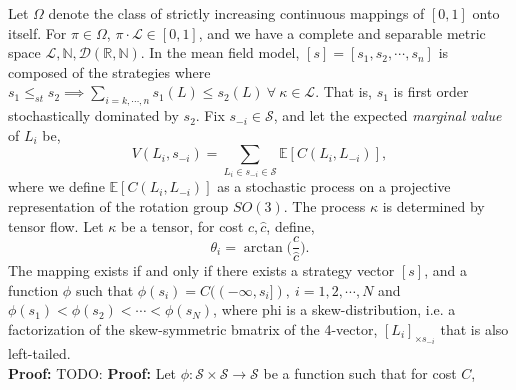 \documentclass[10pt]{article}
\newcommand{\mcL}{\mathcal{L}}
\newcommand{\mcS}{\mathcal{S}}
\newcommand{\mcD}{\mathcal{D}}
\theoremstyle{definition}
\begin{document}
Let $\Omega$ denote the class of strictly increasing continuous mappings of
$[0,1]$ onto itself. For $\pi \in \Omega$, $\pi \cdot \mcL \in [0,1]$, and we have a complete 
and separable metric space $\mcL, \mathbb{N}, \mcD(\mathbb{R},\mathbb{N})$.
In the mean field model, $[s]= [s_1, s_2, \cdots, s_n]$ is composed of
the strategies where $s_1 \le_{st} s_2 \implies \sum_{i = k, \cdots, n} s_1(L)
\le s_2(L) \ \forall \ \kappa \in \mcL$. That is, $s_1$ is first order
stochastically dominated by $s_2$. 
Fix $s_{-i}\in \mcS$, and let the expected \emph{marginal value} of $L_i$ be,
$$
    V(L_i,s_{-i}) = \displaystyle\sum_{L_i\in s_{-i}\in \mcS}\mathbb{E}[C(L_i,
    L_{-i})],
$$
where we define $\mathbb{E}[C(L_i,L_{-i})]$ 
as a stochastic process on a projective representation of the rotation group
$SO(3)$. The process $\kappa$ is determined by tensor flow.
Let $\kappa$ be a tensor, for cost $c, \hat c$, define,
$$
    \theta_i = \arctan\bigg(\frac{c}{\hat c}\bigg).
$$
The mapping exists if and only if there exists a strategy vector $[s]$, and a
function $\phi$ such that $\phi(s_i) = C((-\infty,s_i]), \ i = 1,2,\cdots, N$ and $\phi(s_1) < \phi(s_2) < \cdots < \phi(s_N)$, where phi is a skew-distribution, i.e. a
factorization of the skew-symmetric
bmatrix of the 4-vector, $[L_i]_{\times s_{-i}}$ that is also left-tailed.\\
\textbf{Proof:} TODO: %
\textbf{Proof:} 
Let $\phi:\mcS\times\mcS \rightarrow \mcS$ be a function such that 
for cost $C$,
\end{document}
